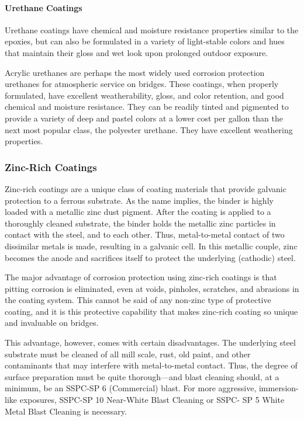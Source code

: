 \paragraph{Urethane Coatings}
Urethane coatings have chemical and moisture resistance properties similar to the epoxies, but can also be
formulated in a variety of light-stable colors and hues that maintain their gloss and wet look upon prolonged outdoor
exposure.

Acrylic urethanes are perhaps the most widely used corrosion protection urethanes for atmospheric service on
bridges. These coatings, when properly formulated, have excellent weatherability, gloss, and color retention, and
good chemical and moisture resistance. They can be readily tinted and pigmented to provide a variety of deep and
pastel colors at a lower cost per gallon than the next most popular class, the polyester urethane. They have excellent
weathering properties.

\subsubsection{Zinc-Rich Coatings}
Zinc-rich coatings are a unique class of coating materials that provide galvanic protection to a ferrous substrate.
As the name implies, the binder is highly loaded with a metallic zinc dust pigment. After the coating is applied to a
thoroughly cleaned substrate, the binder holds the metallic zinc particles in contact with the steel, and to each other.
Thus, metal-to-metal contact of two dissimilar metals is made, resulting in a galvanic cell. In this metallic couple,
zinc becomes the anode and sacrifices itself to protect the underlying (cathodic) steel.

The major advantage of corrosion protection using zinc-rich coatings is that pitting corrosion is eliminated, even
at voids, pinholes, scratches, and abrasions in the coating system. This cannot be said of any non-zinc type of
protective coating, and it is this protective capability that makes zinc-rich coating so unique and invaluable on
bridges.

This advantage, however, comes with certain disadvantages. The underlying steel substrate must be cleaned of all
mill scale, rust, old paint, and other contaminants that may interfere with metal-to-metal contact. Thus, the degree of
surface preparation must be quite thorough—and blast cleaning should, at a minimum, be an SSPC-SP 6
(Commercial) blast. For more aggressive, immersion-like exposures, SSPC-SP 10 Near-White Blast Cleaning or
SSPC- SP 5 White Metal Blast Cleaning is necessary.

